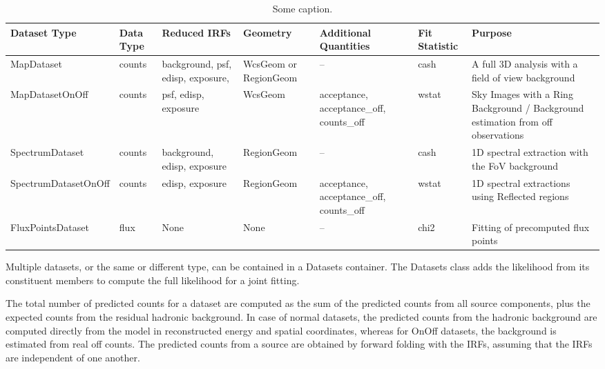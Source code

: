 \begin{table*}[!ht]
	\centering
	\begin{tabular}{|l|l|l|l|l|l|l|}
		\hline
		Dataset Type         & Data Type & Reduced IRFs                      & Geometry              & Additional Quantities                    & Fit Statistic & Purpose                                                                         \\ \hline
		MapDataset           & counts    & background, psf, edisp, exposure, & WcsGeom or RegionGeom & --                                       & cash          & A full 3D analysis with a field of view background                              \\ \hline
		MapDatasetOnOff      & counts    & psf, edisp, exposure              & WcsGeom               & acceptance, acceptance\_off, counts\_off & wstat         & Sky Images with a Ring Background / Background estimation from off observations \\ \hline
		SpectrumDataset      & counts    & background, edisp, exposure       & RegionGeom            & --                                       & cash          & 1D spectral extraction with the FoV background                                  \\ \hline
		SpectrumDatasetOnOff & counts    & edisp, exposure                   & RegionGeom            & acceptance, acceptance\_off, counts\_off & wstat         & 1D spectral extractions using Reflected regions                                 \\ \hline
		FluxPointsDataset    & flux      & None                              & None                  & --                                       & chi2          & Fitting of precomputed flux points                                              \\ \hline
	\end{tabular}
	\caption{Some caption.}
	\label{table:datasets_types}
\end{table*}

Multiple datasets, or the same or different type, can be contained in a Datasets container. The Datasets class adds the likelihood from its constituent members to compute the full likelihood for a joint fitting.

The total number of predicted counts for a dataset are computed as the sum of the predicted counts from all source components, plus the expected counts from the residual hadronic background. In case of normal datasets, the predicted counts from the hadronic background are computed directly from the model in reconstructed energy and spatial coordinates, whereas for OnOff datasets, the background is estimated from real off counts. The predicted counts from a source are obtained by forward folding with the IRFs, assuming that the IRFs are independent of one another.
